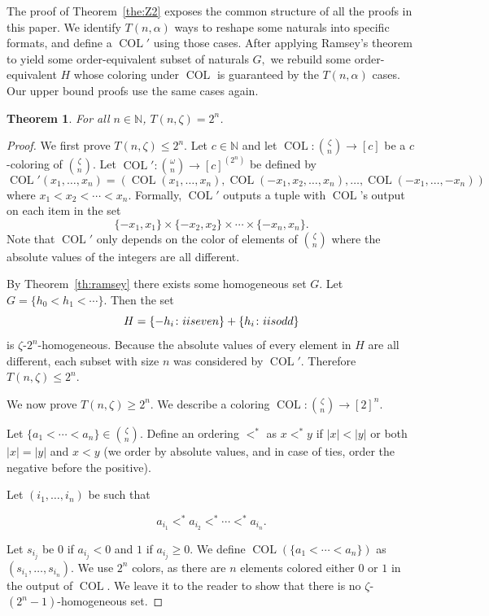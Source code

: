 \documentclass[11pt]{article}
\newcommand{\COL}{\operatorname{COL}}
\newcommand{\N}{\mathbb{N}}
\newcommand{\numpoints}{n}
\newcommand{\numcolors}{c}
\newcommand{\commonconst}{a}
\theoremstyle{plain}
\newtheorem{theorem}{Theorem}[section]
\theoremstyle{definition}
\begin{document}
The proof of Theorem~\ref{the:Z2} exposes the common structure of all the proofs in this
paper. We identify $T(n, \alpha)$ ways to reshape some naturals into specific formats, and
define a $\COL'$ using those cases. After applying Ramsey's theorem to yield some
order-equivalent subset of naturals $G,$ we rebuild some
order-equivalent $H$ whose coloring under $\COL$ is guaranteed by the $T(n, \alpha)$ cases.
Our upper bound proofs use the same cases again.

\begin{theorem}\label{th:zeta}
For all $\numpoints \in \N$, $T(\numpoints,\zeta)=2^{\numpoints}$. 
\end{theorem}

\begin{proof}
We first prove
$T(\numpoints,\zeta)\leq 2^\numpoints$. 
Let $\numcolors \in \N$ and let 
$\COL\colon \binom{\zeta}{\numpoints}\to [\numcolors]$ 
be a $\numcolors$-coloring of $\binom{\zeta}{\numpoints}$.
Let $\COL'\colon \binom{\omega}{n}\to [\numcolors]^{(2^n)}$ be defined by 
$$\COL'(x_1,\ldots,x_{\numpoints}) = (\COL(x_1,\ldots,x_{\numpoints}),\COL(-x_1,x_2,\ldots,x_{\numpoints}),\ldots,\COL(-x_1,\ldots,-x_{\numpoints}))$$ where $x_1 < x_2 < \cdots < x_{\numpoints}.$
Formally, $\COL'$ outputs a tuple with $\COL$'s output on each item in the set $$
\{-x_1,x_1\} \times \{-x_2,x_2\} \times \cdots \times \{-x_\numpoints, x_\numpoints\}.
$$
Note that $\COL'$ only depends on the color of elements of $\binom{\zeta}{\numpoints}$ where the absolute values of the integers are all different. 

By Theorem~\ref{th:ramsey} there exists some homogeneous set $G$. Let $G = \{h_0 < h_1 < \cdots \}$.
Then the set $$H= \{-h_i \colon i \textnormal{ is even}\} + \{h_i \colon i \textnormal{ is odd}\}$$ is $\zeta$-$2^{\numpoints}$-homogeneous. Because the absolute values of every element in $H$ are all different, each subset with size $\numpoints$ was considered by $\COL'$. Therefore $T(\numpoints,\zeta)\leq 2^{\numpoints}$.

We now prove $T(\numpoints,\zeta)\geq 2^{\numpoints}$.
We describe a coloring $\COL \colon \binom{\zeta}{\numpoints} \to [2]^{\numpoints}$.


Let $\{\commonconst_1<\cdots<\commonconst_{\numpoints}\} \in \binom{\zeta}{\numpoints}$.
Define an ordering $<^\ast$ as $x<^\ast y$ if $|x| < |y|$ or both $|x|=|y|$ and $x<y$ (we order by absolute values, and in case of ties, order the negative before the positive).

Let $(i_1,\ldots,i_{\numpoints})$ be such that 

$$\commonconst_{i_1} <^\ast  \commonconst_{i_2} <^\ast  \cdots <^\ast  \commonconst_{i_{\numpoints}}.$$

Let $s_{i_j}$ be $0$ if $\commonconst_{i_j}<0$ and $1$ if $\commonconst_{i_j}\geq 0$. 
We define $\COL(\{\commonconst_1<\cdots<\commonconst_{\numpoints}\})$ as $(s_{i_1},\ldots,s_{i_{\numpoints}})$. 
We use $2^{\numpoints}$ colors, as there are $\numpoints$ elements colored either $0$ or $1$ in the output
of $\COL.$
We leave it to the reader to show that there is
no $\zeta$-$(2^\numpoints-1)$-homogeneous set. 

\end{proof} 
\end{document}
